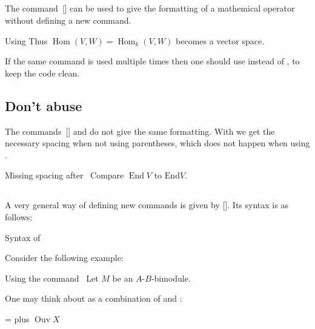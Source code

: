 \subsection{}

The command~[\comname] can be used to give the formatting of a mathemical operator without defining a new command.
\begin{showlatex}{Using }
Thus $\operatorname{Hom}(V,W) = \operatorname{Hom}_k(V,W)$ becomes a vector space.
\end{showlatex}
If the same command is used multiple times then one should use  instead of , to keep the code clean.



\subsection{Don’t abuse }

The commands~[\comname] and  do not give the same formatting.
With  we get the necessary spacing when not using parentheses, which does not happen when using .
\begin{showlatex}{Missing spacing after~}
Compare $\operatorname{End} V$ to $\mathrm{End} V$.
\end{showlatex}



\subsection{}

A very general way of defining new commands is given by [\comname].
Its syntax is as follows:
\begin{showcode}{Syntax of }
\newcommand{\name}[number of arguments n]{ definition including #1, ..., #n }
\end{showcode}
Consider the following example:
\begin{showlatex}{Using the command~}
\newcommand{\bimodule}[2]{#1-#2-bimodule}
Let $M$ be an \bimodule{$A$}{$B$}.
\end{showlatex}
One may think about  as a combination of  and :
\begin{showlatex}{ =  plus }
\newcommand{\Ouv}{\operatorname{Ouv}}
$\Ouv X$
\end{showlatex}

